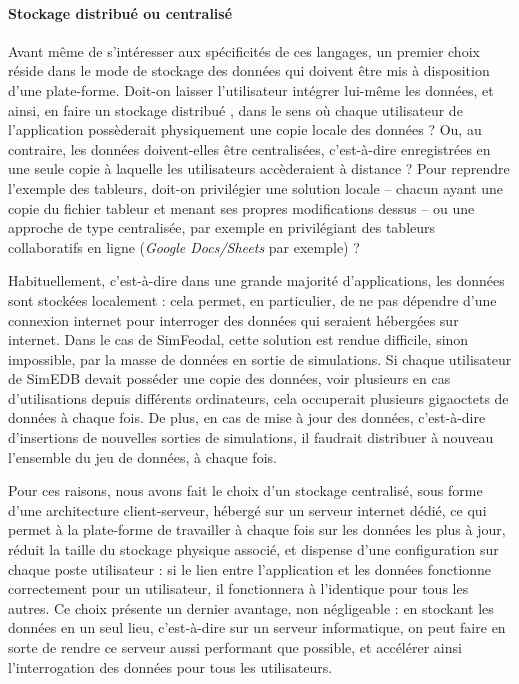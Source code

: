 			\paragraph*{Stockage distribué ou centralisé}\label{par:stockage-centralise}
			Avant même de s'intéresser aux spécificités de ces langages, un premier choix réside dans le mode de stockage des données qui doivent être mis à disposition d'une plate-forme.
			Doit-on laisser l'utilisateur intégrer lui-même les données, et ainsi, en faire un stockage \og distribué \fg{}, dans le sens où chaque utilisateur de l'application possèderait physiquement une copie locale des données ?
			Ou, au contraire, les données doivent-elles être centralisées, c'est-à-dire enregistrées en une seule copie à laquelle les utilisateurs accèderaient à distance ?
			Pour reprendre l'exemple des tableurs, doit-on privilégier une solution locale -- chacun ayant une copie du fichier tableur et menant ses propres modifications dessus -- ou une approche de type centralisée, par exemple en privilégiant des tableurs collaboratifs en ligne (\textit{Google Docs/Sheets} par exemple) ?

			Habituellement, c'est-à-dire dans une grande majorité d'applications, les données sont stockées localement : cela permet, en particulier, de ne pas dépendre d'une connexion internet pour interroger des données qui seraient hébergées sur internet.
			Dans le cas de SimFeodal, cette solution est rendue difficile, sinon impossible, par la masse de données en sortie de simulations.
			Si chaque utilisateur de SimEDB devait posséder une copie des données, voir plusieurs en cas d'utilisations depuis différents ordinateurs, cela occuperait plusieurs gigaoctets de données à chaque fois.
			De plus, en cas de mise à jour des données, c'est-à-dire d'insertions de nouvelles sorties de simulations, il faudrait distribuer à nouveau l'ensemble du jeu de données, à chaque fois.

			Pour ces raisons, nous avons fait le choix d'un stockage centralisé, sous forme d'une architecture \og client-serveur\fg{}, hébergé sur un serveur internet dédié, ce qui permet à la plate-forme de travailler à chaque fois sur les données les plus à jour, réduit la taille du stockage physique associé, et dispense d'une configuration sur chaque poste utilisateur :
			si le lien entre l'application et les données fonctionne correctement pour un utilisateur, il fonctionnera à l'identique pour tous les autres.
			Ce choix présente un dernier avantage, non négligeable :
			en stockant les données en un seul lieu, c'est-à-dire sur un serveur informatique, on peut faire en sorte de rendre ce serveur aussi performant que possible, et accélérer ainsi l'interrogation des données pour tous les utilisateurs.

